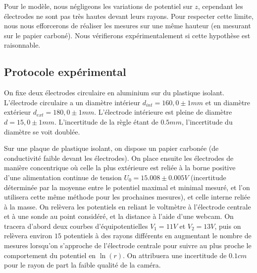 \documentclass[12pt]{article}
\begin{document}
	Pour le modèle, nous négligeons les variations de potentiel sur $z$, cependant les électrodes ne sont pas très hautes devant leurs rayons. Pour respecter cette limite, nous nous efforcerons de réaliser
	les mesures sur une même hauteur (en mesurant sur le papier carboné). Nous vérifierons expérimentalement si cette hypothèse est raisonnable.
	
	\subsection{Protocole expérimental}
	On fixe deux électrodes circulaire en aluminium sur du plastique isolant. L'électrode circulaire a un diamètre intérieur $d_{int} = 160,0 \pm 1 mm$ et un diamètre extérieur $d_{ext} = 180,0\pm 1 mm$.
	L'électrode intérieure est pleine de diamètre $d=15,0\pm 1 mm$. L'incertitude de la règle étant de $0.5mm$, l'incertitude du diamètre se voit doublée.
	
	Sur une plaque de plastique isolant, on dispose un papier carbonée (de conductivité faible devant les électrodes). On place ensuite les électrodes de manière concentrique 
	où celle la plus extérieure est reliée à la borne positive d'une alimentation continue de tension $U_0 = 15.008 \pm 0.005V$ (incertitude déterminée par la moyenne entre le potentiel maximal et minimal mesuré, et l'on utilisera cette même méthode pour les prochaines mesures), et celle interne reliée à la masse.
	On relèvera les potentiels en reliant le voltmètre à l'électrode centrale et à une sonde au point considéré, et la distance à l'aide d'une webcam. On tracera d'abord deux courbes d'équipotentielles $V_1 = 11V$ et $V_2 = 13V$, puis on relèvera environ $15$ potentiels
	à des rayons différents en augmentant le nombre de mesures lorsqu'on s'approche de l'électrode centrale pour suivre au plus proche le comportement du potentiel en $\ln(r)$. On attribuera une incertitude de $0.1cm$ pour le rayon de part la faible qualité de la caméra.
	
\end{document}
